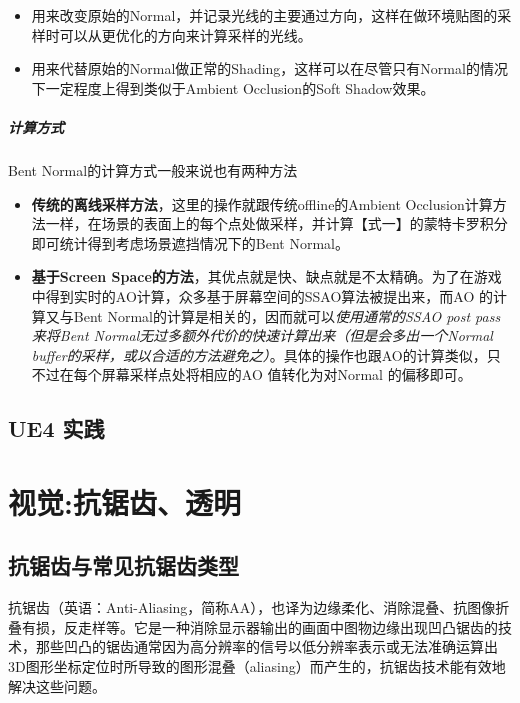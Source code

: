 \documentclass[UTF8,a4paper,12pt]{ctexbook}
\begin{document}
			\begin{itemize}
				\item 用来改变原始的Normal，并记录光线的主要通过方向，这样在做环境贴图的采样时可以从更优化的方向来计算采样的光线。
				\item 用来代替原始的Normal做正常的Shading，这样可以在尽管只有Normal的情况下一定程度上得到类似于Ambient Occlusion的Soft Shadow效果。
			\end{itemize}
			
		
		\paragraph{计算方式}
			Bent Normal的计算方式一般来说也有两种方法
			
			\begin{itemize}
				\item \textbf{传统的离线采样方法}，这里的操作就跟传统offline的Ambient Occlusion计算方法一样，在场景的表面上的每个点处做采样，并计算【式一】的蒙特卡罗积分即可统计得到考虑场景遮挡情况下的Bent Normal。
				\item \textbf{基于Screen Space的方法}，其优点就是快、缺点就是不太精确。为了在游戏中得到实时的AO计算，众多基于屏幕空间的SSAO算法被提出来，而AO 的计算又与Bent Normal的计算是相关的，因而就可以\textit{使用通常的SSAO post pass来将Bent Normal无过多额外代价的快速计算出来（但是会多出一个Normal  buffer的采样，或以合适的方法避免之）}。具体的操作也跟AO的计算类似，只不过在每个屏幕采样点处将相应的AO 值转化为对Normal 的偏移即可。
			\end{itemize}
		
		
	\section{UE4 实践}
		
		
		
			

\chapter{视觉:抗锯齿、透明}
	\section{抗锯齿与常见抗锯齿类型}
		抗锯齿（英语：Anti-Aliasing，简称AA），也译为边缘柔化、消除混叠、抗图像折叠有损，反走样等。它是一种消除显示器输出的画面中图物边缘出现凹凸锯齿的技术，那些凹凸的锯齿通常因为高分辨率的信号以低分辨率表示或无法准确运算出3D图形坐标定位时所导致的图形混叠（aliasing）而产生的，抗锯齿技术能有效地解决这些问题。
		
\end{document}
